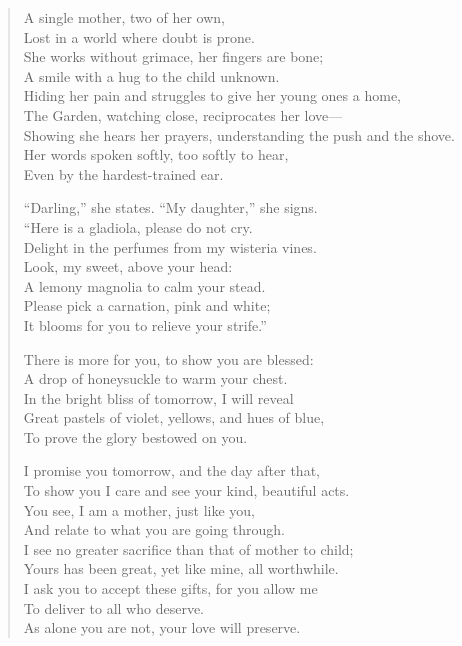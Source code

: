 \documentclass[12pt]{amsart}
\begin{document}
\begin{verse}
A single mother, two of her own,\\
Lost in a world where doubt is prone.\\
She works without grimace, her fingers are bone;\\
A smile with a hug to the child unknown.\\
Hiding her pain and struggles to give her young ones a home,\\
The Garden, watching close, reciprocates her love---\\
Showing she hears her prayers, understanding the push and the shove.\\
Her words spoken softly, too softly to hear,\\
Even by the hardest-trained ear.

``Darling,'' she states. ``My daughter,'' she signs.\\
``Here is a gladiola, please do not cry.\\
Delight in the perfumes from my wisteria vines.\\
Look, my sweet, above your head:\\
A lemony magnolia to calm your stead.\\
Please pick a carnation, pink and white;\\
It blooms for you to relieve your strife.''

There is more for you, to show you are blessed:\\
A drop of honeysuckle to warm your chest.\\
In the bright bliss of tomorrow, I will reveal\\
Great pastels of violet, yellows, and hues of blue,\\
To prove the glory bestowed on you.

I promise you tomorrow, and the day after that,\\
To show you I care and see your kind, beautiful acts.\\
You see, I am a mother, just like you,\\
And relate to what you are going through.\\
I see no greater sacrifice than that of mother to child;\\
Yours has been great, yet like mine, all worthwhile.\\
I ask you to accept these gifts, for you allow me\\
To deliver to all who deserve.\\
As alone you are not, your love will preserve.


\end{verse}
\end{document}
